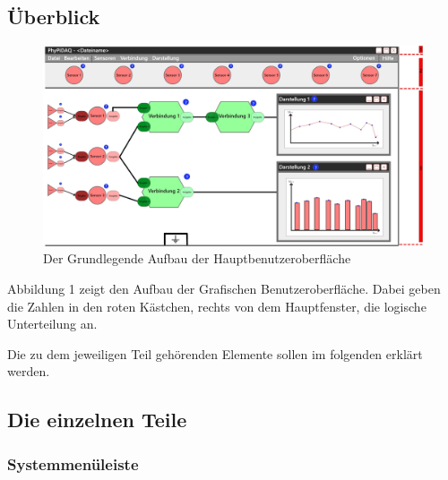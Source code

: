 \documentclass[parskip=full]{scrartcl}
\begin{document}
\subsection{Überblick}

\begin{figure}[h]
	\begin{center}
		\includegraphics[width = 12cm]{Grafik/GUI-mit-Segmenten.jpg}
		\caption{Der Grundlegende Aufbau der Hauptbenutzeroberfläche}
		\label{GUI_Grundlage}
	\end{center}
\end{figure}

Abbildung 1 zeigt den Aufbau der Grafischen Benutzeroberfläche. Dabei geben die Zahlen in den roten Kästchen, rechts von dem Hauptfenster, die logische Unterteilung an.

Die zu dem jeweiligen Teil gehörenden Elemente sollen im folgenden erklärt werden.

\subsection{Die einzelnen Teile}

\subsubsection{Systemmenüleiste}
\end{document}
